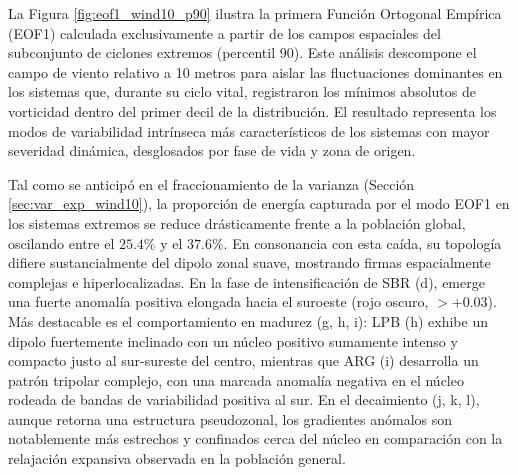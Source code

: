 La Figura \ref{fig:eof1_wind10_p90} ilustra la primera Función Ortogonal Empírica (EOF1) calculada exclusivamente a partir de los campos espaciales del subconjunto de ciclones extremos (percentil 90). Este análisis descompone el campo de viento relativo a 10 metros para aislar las fluctuaciones dominantes en los sistemas que, durante su ciclo vital, registraron los mínimos absolutos de vorticidad dentro del primer decil de la distribución. El resultado representa los modos de variabilidad intrínseca más característicos de los sistemas con mayor severidad dinámica, desglosados por fase de vida y zona de origen.

Tal como se anticipó en el fraccionamiento de la varianza (Sección \ref{sec:var_exp_wind10}), la proporción de energía capturada por el modo EOF1 en los sistemas extremos se reduce drásticamente frente a la población global, oscilando entre el $25.4\%$ y el $37.6\%$. En consonancia con esta caída, su topología difiere sustancialmente del dipolo zonal suave, mostrando firmas espacialmente complejas e hiperlocalizadas. En la fase de intensificación de SBR (d), emerge una fuerte anomalía positiva elongada hacia el suroeste (rojo oscuro, $>+0.03$). Más destacable es el comportamiento en madurez (g, h, i): LPB (h) exhibe un dipolo fuertemente inclinado con un núcleo positivo sumamente intenso y compacto justo al sur-sureste del centro, mientras que ARG (i) desarrolla un patrón tripolar complejo, con una marcada anomalía negativa en el núcleo rodeada de bandas de variabilidad positiva al sur. En el decaimiento (j, k, l), aunque retorna una estructura pseudozonal, los gradientes anómalos son notablemente más estrechos y confinados cerca del núcleo en comparación con la relajación expansiva observada en la población general.

